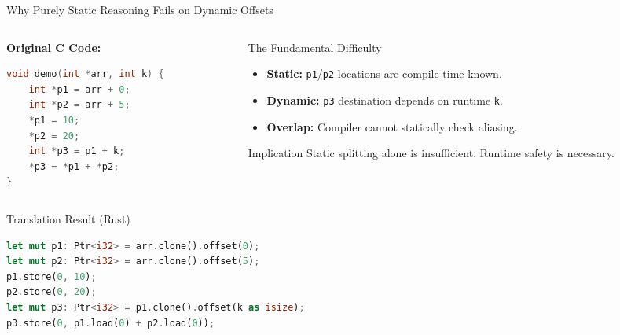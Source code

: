 \documentclass[aspectratio=169,11pt,professionalfonts]{beamer}
\begin{document}
\begin{frame}[fragile]{Why Purely Static Reasoning Fails on Dynamic Offsets}
  
  \begin{columns}[T, totalwidth=\textwidth]
    \begin{column}{0.48\textwidth}
      {\small\textbf{\color{keywordblue}Original C Code:}}
      \begin{lstlisting}[language=C, basicstyle=\ttfamily\tiny]
void demo(int *arr, int k) {
    int *p1 = arr + 0;
    int *p2 = arr + 5;
    *p1 = 10;
    *p2 = 20;
    int *p3 = p1 + k;
    *p3 = *p1 + *p2;
}
      \end{lstlisting}
    \end{column}
    
    \begin{column}{0.48\textwidth}
      \begin{block}{The Fundamental Difficulty}
        \begin{itemize}\setlength{\itemsep}{1pt}\tiny
          \item \textbf{Static:} \texttt{p1}/\texttt{p2} locations are compile-time known.
          \item \textbf{Dynamic:} \texttt{p3} destination depends on runtime \texttt{k}.
          \item \textbf{Overlap:} Compiler cannot statically check aliasing.
        \end{itemize}
      \end{block}
      
      \begin{alertblock}{Implication}
        \tiny Static splitting alone is insufficient. Runtime safety is necessary.
      \end{alertblock}
    \end{column}
  \end{columns}

  \vspace{0.4em}
  \textcolor{lightgray}{\hrulefill}
  \vspace{0.4em}

  \begin{exampleblock}{Translation Result (Rust)}
    \begin{lstlisting}[language=Rust, basicstyle=\ttfamily\tiny]
let mut p1: Ptr<i32> = arr.clone().offset(0);
let mut p2: Ptr<i32> = arr.clone().offset(5);
p1.store(0, 10);
p2.store(0, 20);
let mut p3: Ptr<i32> = p1.clone().offset(k as isize);
p3.store(0, p1.load(0) + p2.load(0));
    \end{lstlisting}
  \end{exampleblock}

\end{frame}
\end{document}
